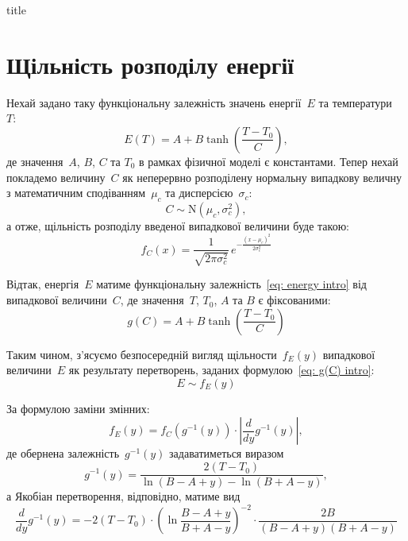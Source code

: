 \documentclass{mathreport}
\begin{document}

{title}

\tableofcontents

\newpage
\section{Щільність розподілу енергії}

\setcounter{subsection}{1}
\setcounter{equation}{0}

Нехай задано таку функціональну залежність значень енергії~$E$ та температури~$T:$
\begin{equation}\label{eq: energy intro}
    E(T) = A + B\tanh{\left( \frac{T-T_0}{C} \right)},
\end{equation}
де значення~$A$, $B$, $C$ та $T_0$ в рамках фізичної моделі є константами. Тепер нехай покладемо величину~$C$ як неперервно розподілену нормальну випадкову величну з математичним сподіванням~$\mu_c$ та дисперсією~$\sigma_c:$
\begin{equation}\label{eq: C coefficient distribution}
    C \sim \mathrm{N}(\mu_c,\sigma_c^2),
\end{equation}
а отже, щільність розподілу введеної випадкової величини буде такою:
\begin{equation}\label{eq: C explicit coefficient distribution}
    f_C(x) = \frac{1}{\sqrt{2\pi \sigma_c^2}}\, e^{-\frac{(x-\mu_c)^2}{2\sigma_c^2}}
\end{equation}

Відтак, енергія~$E$ матиме функціональну залежність~\eqref{eq: energy intro} від випадкової величини~$C$, де значення~$T$, $T_0$, $A$ та $B$ є фіксованими:
\begin{equation}\label{eq: g(C) intro}
    g(C) = A + B\tanh{\left( \frac{T-T_0}{C} \right)}
\end{equation}

Таким чином, з'ясуємо безпосередній вигляд щільности~$f_E(y)$ випадкової величини~$E$ як результату перетворень, заданих формулою~\eqref{eq: g(C) intro}:
\begin{equation}\label{eq: energy distribution intro}
    E \sim f_E(y)
\end{equation}

За формулою заміни змінних:
\begin{equation}\label{eq: сhange of variables formula}
    f_E(y) = f_C\left( g^{-1}(y) \right) \cdot \left| \frac{d}{dy}g^{-1}(y) \right|,
\end{equation}
де обернена залежність~$g^{-1}(y)$ задаватиметься виразом
\begin{equation}\label{eq: inverse g(y)}
    g^{-1}(y) = \frac{2(T-T_0)}{\ln{(B-A+y)} - \ln{(B+A-y)}},
\end{equation}
а Якобіан перетворення, відповідно, матиме вид
\begin{equation}\label{eq: Jacobian}
    \frac{d}{dy}g^{-1}(y) = -2(T-T_0) \cdot \left( \ln{\frac{B-A+y}{B+A-y}} \right)^{-2} \cdot \frac{2B}{(B-A+y)(B+A-y)}
\end{equation}
\end{document}
